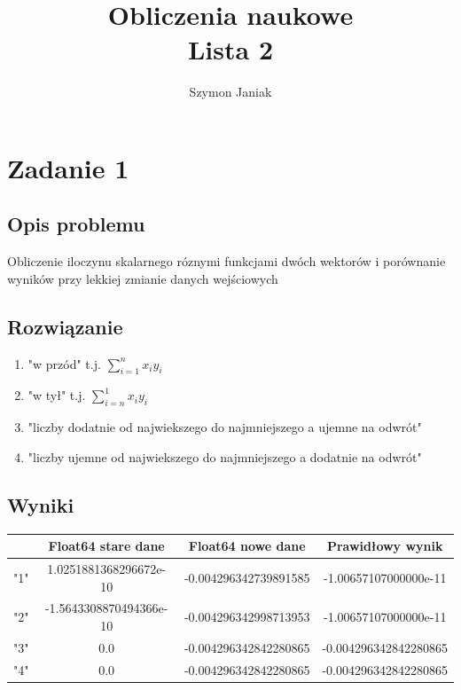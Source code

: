 \documentclass{article}
\title{%
	Obliczenia naukowe \\
	\large Lista 2}
\author{Szymon Janiak}
\begin{document}
\maketitle

\section{Zadanie 1}
\subsection{Opis problemu}
    Obliczenie iloczynu skalarnego róznymi funkcjami dwóch wektorów i porównanie wyników przy lekkiej zmianie danych wejściowych
\subsection{Rozwiązanie}
    \begin{enumerate}
        \item "w przód" t.j. $\sum^n_{i=1} x_i y_i$
        \item "w tył" t.j. $\sum^1_{i=n} x_i y_i$
        \item "liczby dodatnie od najwiekszego do najmniejszego a ujemne na odwrót"
        \item "liczby ujemne od najwiekszego do najmniejszego a dodatnie na odwrót"
    \end{enumerate}
\subsection{Wyniki}
    \begin{center}
        \begin{tabular}{|c|c|c|c|}
        \hline
            & Float64 stare dane & Float64 nowe dane & Prawidłowy wynik \\
            \hline\hline
            "1" & 1.0251881368296672e-10 & -0.004296342739891585 & -1.00657107000000e-11\\
             \hline
             "2" & -1.5643308870494366e-10 & -0.004296342998713953 & -1.00657107000000e-11\\
             \hline
             "3" & 0.0 & -0.004296342842280865 & -0.004296342842280865 \\
             \hline
             "4" & 0.0 & -0.004296342842280865 & -0.004296342842280865 \\
        \hline
        \end{tabular}
    \end{center}
\end{document}
